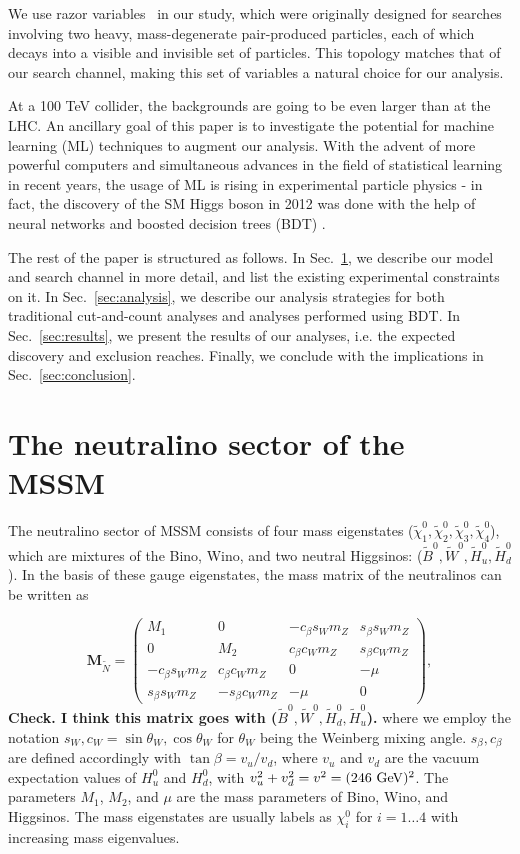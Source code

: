 \documentclass[a4paper,11pt]{article}
\newcommand{\Shufang}[1]{{\bf\color{Maroon}  #1}}
\renewcommand{\H}{\widetilde{H}^0}
\renewcommand{\B}{\widetilde{B}^0}
\newcommand{\N}{\widetilde{\chi}^0}
\begin{document}
We use razor variables~\citep{Rogan:2010kb} in our study, which were originally designed
for searches involving two heavy, mass-degenerate pair-produced
particles, each of which decays into a visible and invisible set of
particles. This topology matches that of our search channel, making this
set of variables a natural choice for our analysis.  

At a 100 TeV collider, the backgrounds are going to be even larger than
at the LHC.  An ancillary goal of this paper is to investigate the
potential for machine learning (ML) techniques to augment our analysis.
With the advent of more powerful computers and simultaneous advances in
the field of statistical learning in recent years, the usage of ML is
rising in experimental particle physics - in fact, the discovery of the
SM Higgs boson in 2012 was done with the help of neural networks
\citep{Aad:2012tfa} and boosted decision trees (BDT)
\citep{Chatrchyan:2012xdj}.

The rest of the paper is structured as follows. In Sec.~\ref{sec:model}, we describe our model and search channel in more
detail, and list the existing experimental constraints on it. In Sec.~\ref{sec:analysis}, we describe our analysis strategies 
for both traditional cut-and-count analyses and analyses
performed using BDT. In Sec.~\ref{sec:results},
we present the results of our analyses, i.e. the expected discovery and exclusion
reaches. Finally, we conclude with the implications in Sec.~\ref{sec:conclusion}.

\section{The neutralino sector of the MSSM}
\label{sec:model}

 
The neutralino sector of MSSM consists of four mass eigenstates
($\N_1,\N_2,\N_3,\N_4$), which
are mixtures of the Bino, Wino, and two neutral Higgsinos: 
($\B,\widetilde{W}^0,\H_u,\H_d$). In the basis of these gauge eigenstates, the mass
matrix of the neutralinos can be written as

\newcommand{\cb}{ c_\beta}
\newcommand{\cw}{ c_W}
\newcommand{\sinb}{ s_\beta}
\newcommand{\sw}{ s_W}
\newcommand{\mz}{ m_Z}

\[\mathbf{M}_{\widetilde{N}}=
\begin{pmatrix}
  M_1 & 0 & -\cb\sw\mz & \sinb\sw\mz \\
  0 & M_2 & \cb\cw\mz & \sinb\cw\mz \\
  -\cb\sw\mz & \cb\cw\mz & 0 & -\mu \\
  \sinb\sw\mz & -\sinb\cw\mz & -\mu & 0
\end{pmatrix},\]
\Shufang{Check.  I think this matrix goes with ($\B,\widetilde{W}^0,\H_d,\H_u$).}
\noindent where we employ the notation $s_W, c_W = \sin\theta_W, \cos\theta_W$ for $\theta_W$ being the Weinberg mixing angle. $s_\beta, c_\beta$ are defined accordingly with $\tan\beta= v_u/v_d$, where $v_u$ and $v_d$ are the
vacuum expectation values of $H_u^0$ and $H_d^0$, with $v_u^2+v_d^2=v^2=(246\ {\rm GeV})^2$. The parameters $M_1$, $M_2$,
and $\mu$ are the mass parameters of Bino, Wino, and Higgsinos.  The mass eigenstates are usually labels as $\chi_i^0$ for $i=1 \ldots 4$ with increasing mass eigenvalues.
\end{document}
